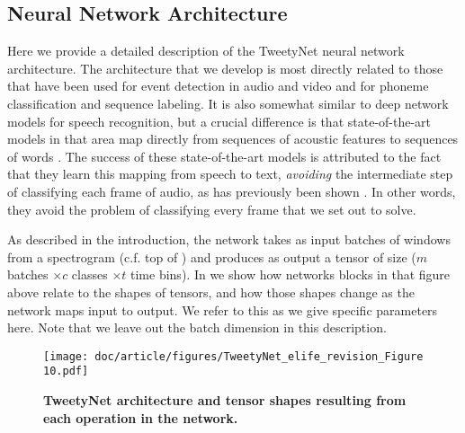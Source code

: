 \documentclass[9pt,lineno]{elife}
\begin{document}
\subsection{Neural Network Architecture}
\label{methods:network}

Here we provide a detailed description of the TweetyNet neural network architecture.
The architecture that we develop is most directly related to those that have been used for event 
detection in audio and video \citep{bock_polyphonic_2012-1,parascandolo_recurrent_2016} 
and for phoneme classification and sequence labeling\citep{graves_framewise_2005,graves_supervised_2012}.
It is also somewhat similar to deep network models for speech recognition, 
but a crucial difference is that state-of-the-art models in that area 
map directly from sequences of acoustic features to sequences of words \citep{graves2006connectionist}.
The success of these state-of-the-art models is 
attributed to the fact that they learn this mapping from speech to text, 
\textit{avoiding} the intermediate step of classifying each frame of audio, 
as has previously been shown \citep{graves_supervised_2012}.
In other words, they avoid the problem of classifying every frame that we set out to solve. 

As described in the introduction, the network takes as input 
batches of windows from a spectrogram (c.f. top of ) 
and produces as output a tensor of size ($m$ batches $\times c$ classes $\times t$ time bins). 
In  we show how networks blocks in that figure above relate 
to the shapes of tensors, and how those shapes change as the network maps input to output. 
We refer to this as we give specific parameters here. 
Note that we leave out the batch dimension in this description.

\begin{figure}[!ht] %
\texttt{[image: doc/article/figures/TweetyNet\_elife\_revision\_Figure 10.pdf]}
\caption{
{\bf TweetyNet architecture and tensor shapes resulting from each operation in the network.}
}
\label{fig:tweetynet-architecture-tensors}
\end{figure}
\end{document}
